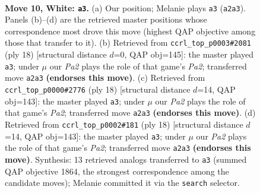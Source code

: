 \documentclass[11pt]{article}
\begin{document}
\clearpage

\begin{figure}[p]\centering
\begin{subfigure}{0.46\textwidth}\centering
\resizebox{\linewidth}{!}{%
\newchessgame
\chessboard[
  setfen={r2q1rk1/1bp1bppp/p1np1n2/1p2p3/4P3/1BN2N1P/PPPP1PP1/R1BQR1K1 w - - 1 10},
  showmover=false,
  pgfstyle=straightmove, color=movearrow, markmove={a2-a3}
]}
\caption{}
\end{subfigure}\hfill
\begin{subfigure}{0.46\textwidth}\centering
\resizebox{\linewidth}{!}{%
\newchessgame
\chessboard[
  setfen={r2q1rk1/1bp1bppp/p1np1n2/1p2p3/4P3/1BN2N1P/PPPP1PP1/R1BQR1K1 w - - 0 10},
  showmover=false,
  pgfstyle=straightmove, color=movearrow, markmove={a2-a3}
]}
\caption{}
\end{subfigure}
\\[4pt]
\begin{subfigure}{0.46\textwidth}\centering
\resizebox{\linewidth}{!}{%
\newchessgame
\chessboard[
  setfen={r2q1rk1/1bp1bppp/p1np1n2/1p2p3/4P3/1BNP1N2/PPP2PPP/R1BQR1K1 w - - 0 10},
  showmover=false,
  pgfstyle=straightmove, color=movearrow, markmove={a2-a3}
]}
\caption{}
\end{subfigure}\hfill
\begin{subfigure}{0.46\textwidth}\centering
\resizebox{\linewidth}{!}{%
\newchessgame
\chessboard[
  setfen={r2q1rk1/1bp1bppp/p1np1n2/1p2p3/4P3/1BNP1N2/PPP2PPP/R1BQR1K1 w - - 0 10},
  showmover=false,
  pgfstyle=straightmove, color=movearrow, markmove={a2-a3}
]}
\caption{}
\end{subfigure}
\caption{\textbf{Move 10, White: \texttt{a3}.} (a) Our position; Melanie plays \texttt{a3} (\texttt{a2a3}). Panels (b)--(d) are the retrieved master positions whose correspondence most drove this move (highest QAP objective among those that transfer to it). (b) Retrieved from \texttt{ccrl\_top\_p0003\#2081} (ply 18) [structural distance $d$=0, QAP obj=145]: the master played \texttt{a3}; under $\mu$ our \emph{Pa2} plays the role of that game's \emph{Pa2}; transferred move \texttt{a2a3} \textbf{(endorses this move)}. (c) Retrieved from \texttt{ccrl\_top\_p0000\#2776} (ply 18) [structural distance $d$=14, QAP obj=143]: the master played \texttt{a3}; under $\mu$ our \emph{Pa2} plays the role of that game's \emph{Pa2}; transferred move \texttt{a2a3} \textbf{(endorses this move)}. (d) Retrieved from \texttt{ccrl\_top\_p0002\#181} (ply 18) [structural distance $d$=14, QAP obj=143]: the master played \texttt{a3}; under $\mu$ our \emph{Pa2} plays the role of that game's \emph{Pa2}; transferred move \texttt{a2a3} \textbf{(endorses this move)}. Synthesis: 13 retrieved analogs transferred to \texttt{a3} (summed QAP objective 1864, the strongest correspondence among the candidate moves); Melanie committed it via the \texttt{search} selector.}
\label{fig:thought-m18}
\end{figure}
\end{document}
